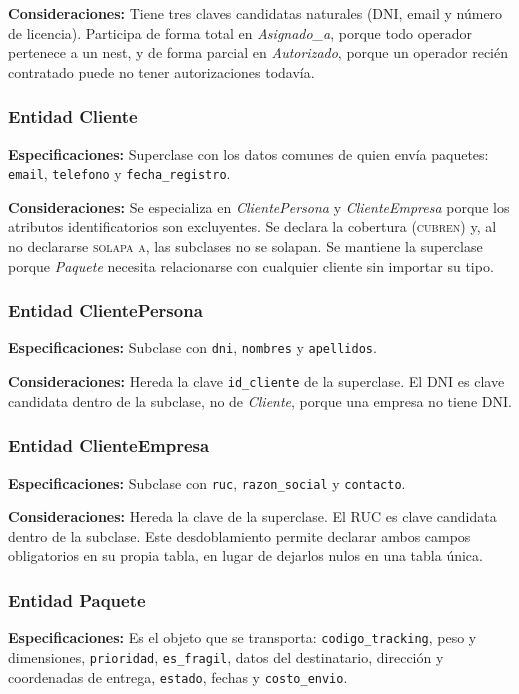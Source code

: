 \documentclass[11pt,a4paper]{article}
\newcommand{\at}[1]{\texttt{#1}}
\begin{document}
\textbf{Consideraciones:} Tiene tres claves candidatas naturales (DNI, email y número de licencia). Participa de forma total en \textit{Asignado\_a}, porque todo operador pertenece a un nest, y de forma parcial en \textit{Autorizado}, porque un operador recién contratado puede no tener autorizaciones todavía.

\subsubsection{Entidad Cliente}
\textbf{Especificaciones:} Superclase con los datos comunes de quien envía paquetes: \at{email}, \at{telefono} y \at{fecha\_registro}.

\textbf{Consideraciones:} Se especializa en \textit{ClientePersona} y \textit{ClienteEmpresa} porque los atributos identificatorios son excluyentes. Se declara la cobertura (\textsc{cubren}) y, al no declararse \textsc{solapa a}, las subclases no se solapan. Se mantiene la superclase porque \textit{Paquete} necesita relacionarse con cualquier cliente sin importar su tipo.

\subsubsection{Entidad ClientePersona}
\textbf{Especificaciones:} Subclase con \at{dni}, \at{nombres} y \at{apellidos}.

\textbf{Consideraciones:} Hereda la clave \at{id\_cliente} de la superclase. El DNI es clave candidata dentro de la subclase, no de \textit{Cliente}, porque una empresa no tiene DNI.

\subsubsection{Entidad ClienteEmpresa}
\textbf{Especificaciones:} Subclase con \at{ruc}, \at{razon\_social} y \at{contacto}.

\textbf{Consideraciones:} Hereda la clave de la superclase. El RUC es clave candidata dentro de la subclase. Este desdoblamiento permite declarar ambos campos obligatorios en su propia tabla, en lugar de dejarlos nulos en una tabla única.

\subsubsection{Entidad Paquete}
\textbf{Especificaciones:} Es el objeto que se transporta: \at{codigo\_tracking}, peso y dimensiones, \at{prioridad}, \at{es\_fragil}, datos del destinatario, dirección y coordenadas de entrega, \at{estado}, fechas y \at{costo\_envio}.
\end{document}
